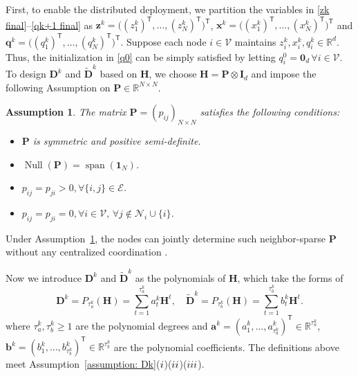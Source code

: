 \documentclass[12pt,draftcls,onecolumn]{IEEEtran}
\renewcommand{\Re}{{\mathbb{R}}}
\newcommand{\bH}{{\mathbf{H}}}
\newcommand{\bD}{{\mathbf{D}}}
\newtheorem{assumption}{Assumption}
\begin{document}
First, to enable the distributed deployment, we partition the variables in \eqref{zk final}--\eqref{qk+1 final} as $\mathbf{z}^k=\big((z_1^k)^{\mathsf{T}},\ldots,(z_N^k)^{\mathsf{T}}\big)^{\mathsf{T}}$, $\mathbf{x}^k=\big((x_1^k)^{\mathsf{T}},\ldots,(x_N^k)^{\mathsf{T}}\big)^{\mathsf{T}}$ and $\mathbf{q}^k=\big((q_1^k)^{\mathsf{T}},\ldots,(q_N^k)^{\mathsf{T}}\big)^{\mathsf{T}}$. Suppose each node $i\in \mathcal{V}$ maintains $z_i^k,x_i^k,q_i^k\in\mathbb{R}^d$. Thus, the initialization in \eqref{q0} can be simply satisfied by letting $q_i^0=\mathbf{0}_d\,\forall i\in\mathcal{V}$. To design $\bD^k$ and $\tilde{\bD}^k$ based on $\bH$, we choose $ \mathbf{H}= \mathbf{P} \otimes \mathbf{I}_d$ and impose the following Assumption on  $\mathbf{P}\in\mathbb{R}^{N\times N}$.
\begin{assumption}\label{assumption: distributed}
    The matrix $\mathbf{P}=(p_{ij})_{N\times N}$ satisfies the following conditions:
    \begin{itemize}
        \item[($\romannumeral1$)] $\mathbf{P}$ is symmetric and positive semi-definite.
        \item[($\romannumeral2$)] $\operatorname{Null}(\mathbf{P})=\operatorname{span}(\mathbf{1}_N)$.
        \item[($\romannumeral3$)] $p_{ij}=p_{ji}>0, \forall \{i,j\}\in \mathcal{E}$.
        \item[($\romannumeral4$)] $p_{ij}=p_{ji}=0, \forall i\in \mathcal{V},\,\forall j\notin \mathcal{N}_i\cup \{i\}$.
    \end{itemize}
\end{assumption}

Under Assumption~\ref{assumption: distributed}, the nodes can jointly determine such neighbor-sparse $\mathbf{P}$ without any centralized coordination \cite{Wu2020AUA}. 

Now we introduce $\bD^k$ and $\tilde{\bD}^k$ as the polynomials of $\bH$, which take the forms of
\vspace{-0.1cm}
\begin{equation*}\label{def Dk}
    \bD^k=P_{\tau_a^k}(\bH)=\sum_{t=1}^{\tau_a^k}a_t^k\mathbf{H}^t, \quad \tilde{\bD}^k=P_{\tau_{b}^k}(\bH)=\sum_{t=1}^{\tau_{b}^k}b_t^k\mathbf{H}^t.
\end{equation*}
where $\tau_a^k,\tau_{b}^k\geq 1$ are the polynomial degrees and $\mathbf{a}^k=(a_1^k,\dots,a_{\tau_a^k}^k)^{\mathsf{T}}\in\Re^{\tau_a^k}$, $\mathbf{b}^k=(b_1^k,\dots,b_{\tau_b^k}^k)^{\mathsf{T}}\in\Re^{\tau_b^k}$ are the polynomial coefficients. The definitions above meet Assumption~\ref{assumption: Dk}($\romannumeral1$)($\romannumeral2$)($\romannumeral3$).
\end{document}
